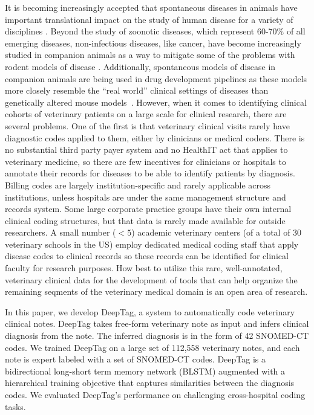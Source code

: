 \documentclass[fleqn,10pt]{wlscirep}
\begin{document}
It is becoming increasingly accepted that spontaneous diseases in animals have important translational impact on the study of human disease for a variety of disciplines \cite{kol2015companion}. Beyond the study of zoonotic diseases, which represent 60-70\% of all emerging diseases, non-infectious diseases, like cancer, have become increasingly studied in companion animals as a way to mitigate some of the problems with rodent models of disease \cite{leblanc2015defining}. Additionally, spontaneous models of disease in companion animals are being used in drug development pipelines as these models more closely resemble the ``real world'' clinical settings of diseases than genetically altered mouse models~\cite{grimm2016bark,klinck2017translational,baraban2014new,hernandez2018naturally}. 
However, when it comes to identifying clinical cohorts of veterinary patients on a large scale for clinical research, there are several problems.  One of the first is that veterinary clinical visits rarely have diagnostic codes applied to them, either by clinicians or medical coders.  There is no substantial third party payer system and no HealthIT act that applies to veterinary medicine, so there are few incentives for clinicians or hospitals to annotate their records for diseases to be able to identify patients by diagnosis.  Billing codes are largely institution-specific and rarely applicable across institutions, unless hospitals are under the same management structure and records system. Some large corporate practice groups have their own internal clinical coding structures, but that data is rarely made available for outside researchers. A small number ($< 5$) academic veterinary centers (of a total of 30 veterinary schools in the US) employ dedicated medical coding staff that apply disease codes to clinical records so these records can be identified for clinical faculty for research purposes. How best to utilize this rare, well-annotated, veterinary clinical data for the development of tools that can help organize the remaining seqments of the veterinary medical domain is an open area of  research. 

In this paper, we develop DeepTag, a system to automatically code veterinary clinical notes. DeepTag takes free-form veterinary note as input and infers clinical diagnosis from the note. The inferred diagnosis is in the form of 42 SNOMED-CT codes. We trained DeepTag on a large set of 112,558 veterinary notes, and each note is expert labeled with a set of SNOMED-CT codes. DeepTag is a bidirectional long-short term memory network (BLSTM) augmented with a hierarchical training objective that captures similarities between the diagnosis codes. We evaluated DeepTag's performance on challenging cross-hospital coding tasks.
\end{document}

